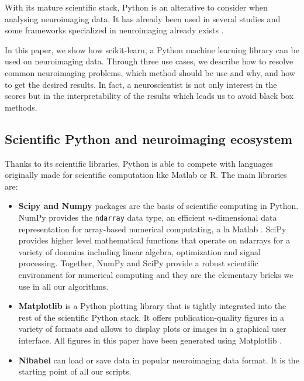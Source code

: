 \documentclass{frontiersSCNS} %
\newcounter{x}
\newcounter{y}
\newcounter{z}
\begin{document}
With its mature scientific stack, Python is an alterative to consider when
analysing neuroimaging data. It has already been used in several studies
\citep{millman2007analysis} and some frameworks specialized in neuroimaging
already exists \citep{hanke2009pymvpa}. %

In this paper, we show how scikit-learn, a Python machine learning library can
be used on neuroimaging data. Through three use cases, we describe how to
resolve common neuroimaging problems, which method should be use and why, and how to
get the desired results. In fact, a neuroscientist is not only interest in the
scores but in the interpretability of the results which leads us to avoid black
box methods.

\subsection{Scientific Python and neuroimaging ecosystem}

Thanks to its scientific libraries, Python is able to compete with languages
originally made for scientific computation like Matlab or R. The main libraries
are:
\begin{itemize}
    \item{\bf Scipy and Numpy} packages are the basis of scientific computing in Python.
        NumPy provides the \verb!ndarray! data type, an efficient $n$-dimensional data
        representation for array-based numerical computating, a la Matlab
        \citep{vanderwalt2011}.
        SciPy provides higher level mathematical functions that operate on ndarrays for
        a variety of domains including linear algebra, optimization and signal
        processing. Together, NumPy and SciPy provide a robust scientific environment
        for numerical computing and they are the elementary bricks we use in all our
        algorithms.

    \item{\bf Matplotlib} is a Python plotting library that is tightly integrated into the
        rest of the scientific Python stack. It offers publication-quality figures in
        a variety of formats and allows to display plots or images in a
        graphical user interface. All figures in this paper have been generated using
        Matplotlib \citep{hunter2007}.

    \item{\bf Nibabel} can load or save data in popular neuroimaging data format.
        It is the starting point of all our scripts.
\end{itemize}
\end{document}
